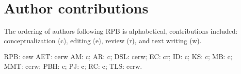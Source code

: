 \documentclass[11pt,]{article}
\begin{document}
\hypertarget{author-contributions}{%
\section{Author contributions}\label{author-contributions}}

The ordering of authors following RPB is alphabetical, contributions
included: conceptualization (c), editing (e), review (r), and text
writing (w).

RPB: cew AET: cerw AM: c; AR: c; DSL: cerw; EC: cr; ID: c; KS: c; MB: c;
MMT: cerw; PBH: c; PJ: c; RC: c; TLS: cerw.





\newpage
\singlespacing
\renewcommand\refname{References}

\end{document}
